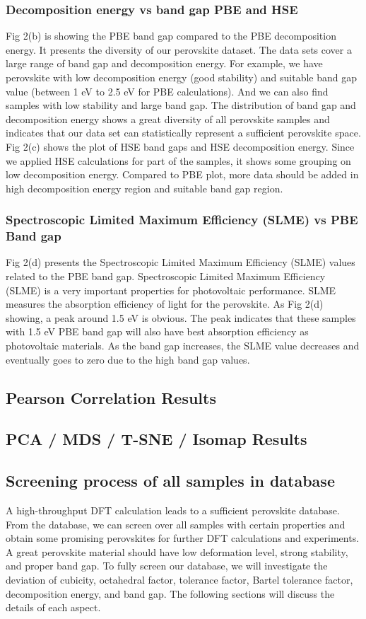\documentclass[twoside,twocolumn,9pt]{article}
\begin{document}
    \subsubsection*{Decomposition energy vs band gap PBE and HSE}
    Fig 2(b) is showing the PBE band gap compared to the PBE decomposition
    energy. It presents the diversity of our perovskite dataset. The data
    sets cover a large range of band gap and decomposition energy. For
    example, we have perovskite with low decomposition energy (good
    stability) and suitable band gap value (between 1 eV to 2.5 eV for PBE
    calculations). And we can also find samples with low stability and
    large band gap. The distribution of band gap and decomposition energy
    shows a great diversity of all perovskite samples and indicates that
    our data set can statistically represent a sufficient perovskite
    space.  Fig 2(c) shows the plot of HSE band gaps and HSE decomposition
    energy. Since we applied HSE calculations for part of the samples, it
    shows some grouping on low decomposition energy. Compared to PBE plot,
    more data should be added in high decomposition energy region and
    suitable band gap region.
    \subsubsection*{Spectroscopic Limited Maximum Efficiency (SLME) vs PBE Band gap}
    Fig 2(d) presents the Spectroscopic Limited Maximum Efficiency (SLME)
    values related to the PBE band gap. Spectroscopic Limited Maximum
    Efficiency (SLME) is a very important properties for photovoltaic
    performance. SLME measures the absorption efficiency of light for the
    perovskite. As Fig 2(d) showing, a peak around 1.5 eV is obvious. The
    peak indicates that these samples with 1.5 eV PBE band gap will also
    have best absorption efficiency as photovoltaic materials. As the band
    gap increases, the SLME value decreases and eventually goes to zero
    due to the high band gap values.
    \subsection*{Pearson Correlation Results}

    \subsection*{PCA / MDS / T-SNE / Isomap Results}

    \subsection*{Screening process of all samples in database}
    A high-throughput DFT calculation leads to a sufficient perovskite
    database. From the database, we can screen over all samples with
    certain properties and obtain some promising perovskites for further
    DFT calculations and experiments. A great perovskite material should
    have low deformation level, strong stability, and proper band gap. To
    fully screen our database, we will investigate the deviation of
    cubicity, octahedral factor, tolerance factor, Bartel tolerance
    factor, decomposition energy, and band gap. The following sections
    will discuss the details of each aspect.
\end{document}
